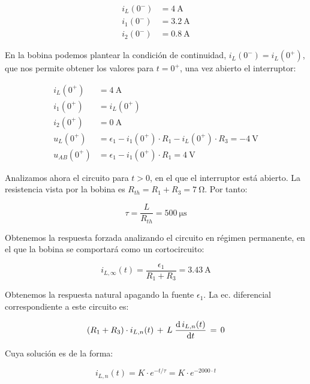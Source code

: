 \vspace{-4mm}
\begin{align*}
  i_L(0^-) &= \qty{4}{\ampere}\\
  i_1(0^-) &= \qty{3.2}{\ampere}\\
  i_2(0^-) &= \qty{0.8}{\ampere}
\end{align*}

En la bobina podemos plantear la condición de continuidad,
$i_L(0^-) = i_L(0^+)$, que nos permite obtener los valores para
$t = 0^+$, una vez abierto el interruptor:

\vspace{-4mm}
\begin{align*}
  i_L(0^+) &= \qty{4}{\ampere}\\
  i_1(0^+) &= i_L(0^+)\\
  i_2(0^+) &= \qty{0}{\ampere}\\
  u_L(0^+) &= \epsilon_1 - i_1(0^+) \cdot R_1 - i_L(0^+) \cdot R_3 = -\qty{4}{\volt}\\
  u_{AB}(0^+) &= \epsilon_1 - i_1(0^+) \cdot R_1 = \qty{4}{\volt}
\end{align*}

Analizamos ahora el circuito para $t > 0$, en el que el interruptor
está abierto. La resistencia vista por la bobina es
$R_{th} = R_1 + R_3 = \qty{7}{\ohm}$. Por tanto:

\begin{equation*}
  \tau = \frac{L}{R_{th}} = \qty{500}{\micro\second}
\end{equation*}

Obtenemos la respuesta forzada analizando el circuito en régimen
permanente, en el que la bobina se comportará como un cortocircuito:

\begin{equation*}
  i_{L,\infty}(t) = \frac{\epsilon_1}{R_1 + R_3} = \qty{3.43}{\ampere}
\end{equation*}

\vspace{2mm}
Obtenemos la respuesta natural apagando la fuente $\epsilon_1$. La ec. diferencial correspondiente a este circuito es:

\[
  (R_1 + R_3) \cdot i_{L,n}(t) \,+\, L \; \diff{\,i_{L,n}(t)}{t} \, = \,  0
\]

\vspace{2mm}
Cuya solución es de la forma:

\begin{equation*}
  i_{L,n}(t) = K \cdot e^{-t/\tau} = K \cdot e^{-2000 \cdot t}
\end{equation*}

